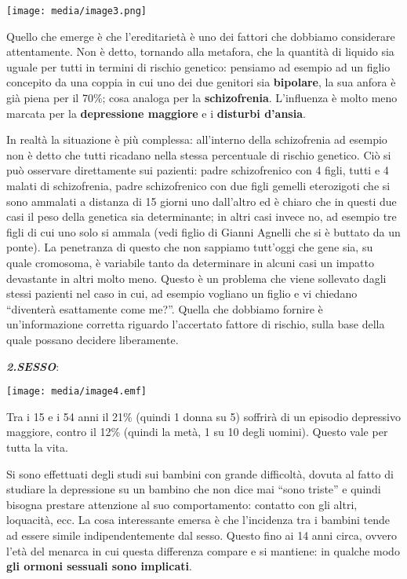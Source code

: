 \documentclass[]{article}
\begin{document}
\texttt{[image: media/image3.png]}

Quello che emerge è che l'ereditarietà è uno dei fattori che dobbiamo
considerare attentamente. Non è detto, tornando alla metafora, che la
quantità di liquido sia uguale per tutti in termini di rischio genetico:
pensiamo ad esempio ad un figlio concepito da una coppia in cui uno dei
due genitori sia \textbf{bipolare}, la sua anfora è già piena per il
70\%; cosa analoga per la \textbf{schizofrenia}. L'influenza è molto
meno marcata per la \textbf{depressione maggiore} e i \textbf{disturbi
d'ansia}.

In realtà la situazione è più complessa: all'interno della schizofrenia
ad esempio non è detto che tutti ricadano nella stessa percentuale di
rischio genetico. Ciò si può osservare direttamente sui pazienti: padre
schizofrenico con 4 figli, tutti e 4 malati di schizofrenia, padre
schizofrenico con due figli gemelli eterozigoti che si sono ammalati a
distanza di 15 giorni uno dall'altro ed è chiaro che in questi due casi
il peso della genetica sia determinante; in altri casi invece no, ad
esempio tre figli di cui uno solo si ammala (vedi figlio di Gianni
Agnelli che si è buttato da un ponte). La penetranza di questo che non
sappiamo tutt'oggi che gene sia, su quale cromosoma, è variabile tanto
da determinare in alcuni casi un impatto devastante in altri molto meno.
Questo è un problema che viene sollevato dagli stessi pazienti nel caso
in cui, ad esempio vogliano un figlio e vi chiedano ``diventerà
esattamente come me?''. Quella che dobbiamo fornire è un'informazione
corretta riguardo l'accertato fattore di rischio, sulla base della quale
possano decidere liberamente.

\textbf{\emph{2.SESSO}}:

\texttt{[image: media/image4.emf]}

Tra i 15 e i 54 anni il 21\% (quindi 1 donna su 5) soffrirà di un
episodio depressivo maggiore, contro il 12\% (quindi la metà, 1 su 10
degli uomini). Questo vale per tutta la vita.

Si sono effettuati degli studi sui bambini con grande difficoltà, dovuta
al fatto di studiare la depressione su un bambino che non dice mai
``sono triste'' e quindi bisogna prestare attenzione al suo
comportamento: contatto con gli altri, loquacità, ecc. La cosa
interessante emersa è che l'incidenza tra i bambini tende ad essere
simile indipendentemente dal sesso. Questo fino ai 14 anni circa, ovvero
l'età del menarca in cui questa differenza compare e si mantiene: in
qualche modo \textbf{gli ormoni sessuali sono implicati}.
\end{document}
